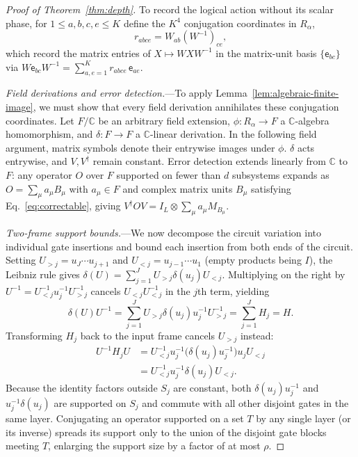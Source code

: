 \documentclass[aps,prl,reprint,longbibliography,nofootinbib,nobibnotes]{revtex4-2}
\newcommand{\id}{I}
\begin{document}
\begin{proof}[Proof of Theorem~\ref{thm:depth}]
To record the logical action without its scalar phase, for $1\le a,b,c,e\le K$ define the $K^4$
conjugation coordinates in $R_\alpha$,
\begin{equation}\label{eq:conjugation-coordinates}
 r_{abce}=W_{ab}(W^{-1})_{ce},
\end{equation}
which record the matrix entries of $X\mapsto WXW^{-1}$ in the matrix-unit basis $\{\mathsf
e_{bc}\}$ via $W\mathsf e_{bc}W^{-1}=\sum_{a,e=1}^{K}r_{abce}\,\mathsf e_{ae}$.

\emph{Field derivations and error detection.}---To apply Lemma~\ref{lem:algebraic-finite-image}, we
must show that every field derivation annihilates these conjugation coordinates. Let $F/\mathbb C$
be an arbitrary field extension, $\phi:R_\alpha\to F$ a $\mathbb C$-algebra homomorphism, and
$\delta:F\to F$ a $\mathbb C$-linear derivation. In the following field argument, matrix symbols
denote their entrywise images under $\phi$. $\delta$ acts entrywise, and $V,V^\dagger$ remain
constant. Error detection extends linearly from $\mathbb C$ to $F$: any operator $O$ over $F$
supported on fewer than $d$ subsystems expands as $O=\sum_\mu a_\mu B_\mu$ with $a_\mu\in F$ and
complex matrix units $B_\mu$ satisfying Eq.~\eqref{eq:correctable}, giving $V^\dagger
OV=\id_L\otimes\sum_\mu a_\mu M_{B_\mu}$.

\emph{Two-frame support bounds.}---We now decompose the circuit variation into individual gate
insertions and bound each insertion from both ends of the circuit. Setting $U_{>j}=u_J\cdots
u_{j+1}$ and $U_{<j}=u_{j-1}\cdots u_1$ (empty products being $\id$), the Leibniz rule gives
$\delta(U)=\sum_{j=1}^J U_{>j}\delta(u_j)U_{<j}$. Multiplying on the right by
$U^{-1}=U_{<j}^{-1}u_j^{-1}U_{>j}^{-1}$ cancels $U_{<j}U_{<j}^{-1}$ in the $j$th term, yielding
\begin{equation}\label{eq:generator}
 \delta(U)U^{-1}=\sum_{j=1}^JU_{>j}\delta(u_j)u_j^{-1}U_{>j}^{-1}=\sum_{j=1}^J H_j=H.
\end{equation}
Transforming $H_j$ back to the input frame cancels $U_{>j}$ instead:
\[
 \begin{aligned}
 U^{-1}H_jU
 &=U_{<j}^{-1}u_j^{-1}\bigl(\delta(u_j)u_j^{-1}\bigr)u_jU_{<j}\\
 &=U_{<j}^{-1}u_j^{-1}\delta(u_j)U_{<j}.
 \end{aligned}
\]
Because the identity factors outside $S_j$ are constant, both $\delta(u_j)u_j^{-1}$ and
$u_j^{-1}\delta(u_j)$ are supported on $S_j$ and commute with all other disjoint gates in the same
layer. Conjugating an operator supported on a set $T$ by any single layer (or its inverse) spreads
its support only to the union of the disjoint gate blocks meeting $T$, enlarging the support size
by a factor of at most $\rho$.


\end{proof}
\end{document}
